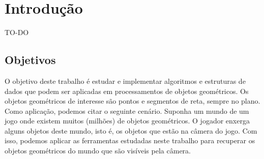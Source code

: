 \chapter{Introdução}

TO-DO


\section{Objetivos}

O objetivo deste trabalho é estudar e implementar algoritmos e estruturas de dados que podem ser aplicadas em processamentos de objetos geométricos. Os objetos geométricos de interesse são pontos e segmentos de reta, sempre no plano. Como aplicação, podemos citar o seguinte cenário. Suponha um mundo de um jogo onde existem muitos (milhões) de objetos geométricos. O jogador enxerga alguns objetos deste mundo, isto é, os objetos que estão na câmera do jogo. Com isso, podemos aplicar as ferramentas estudadas neste trabalho para recuperar os objetos geométricos do mundo que são visíveis pela câmera.


